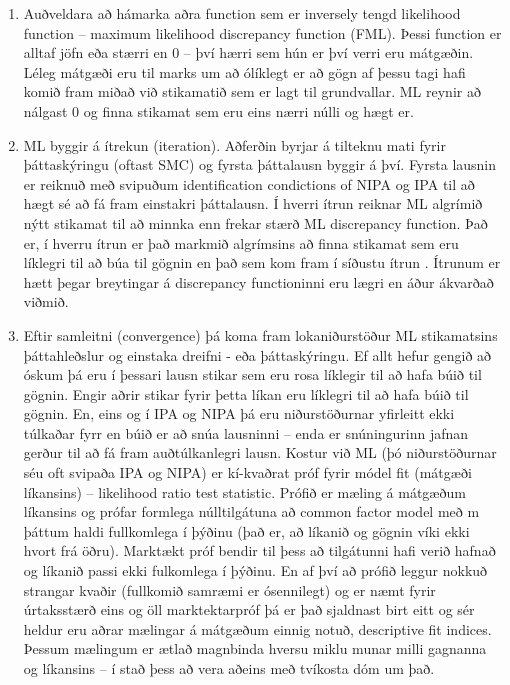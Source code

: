 \documentclass[]{book}
\providecommand{\tightlist}{%
  \setlength{\itemsep}{0pt}\setlength{\parskip}{0pt}}
\begin{document}
\begin{enumerate}
\def\labelenumi{\arabic{enumi})}
\tightlist
\item
  Auðveldara að hámarka aðra function sem er inversely tengd likelihood function -- maximum likelihood discrepancy function (FML). Þessi function er alltaf jöfn eða stærri en 0 -- því hærri sem hún er því verri eru mátgæðin. Léleg mátgæði eru til marks um að ólíklegt er að gögn af þessu tagi hafi komið fram miðað við stikamatið sem er lagt til grundvallar. ML reynir að nálgast 0 og finna stikamat sem eru eins nærri núlli og hægt er.
\item
  ML byggir á ítrekun (iteration). Aðferðin byrjar á tilteknu mati fyrir þáttaskýringu (oftast SMC) og fyrsta þáttalausn byggir á því. Fyrsta lausnin er reiknuð með svipuðum identification condictions of NIPA og IPA til að hægt sé að fá fram einstakri þáttalausn. Í hverri ítrun reiknar ML algrímið nýtt stikamat til að minnka enn frekar stærð ML discrepancy function. Það er, í hverru ítrun er það markmið algrímsins að finna stikamat sem eru líklegri til að búa til gögnin en það sem kom fram í síðustu ítrun . Ítrunum er hætt þegar breytingar á discrepancy functioninni eru lægri en áður ákvarðað viðmið.
\item
  Eftir samleitni (convergence) þá koma fram lokaniðurstöður ML stikamatsins þáttahleðslur og einstaka dreifni - eða þáttaskýringu. Ef allt hefur gengið að óskum þá eru í þessari lausn stikar sem eru rosa líklegir til að hafa búið til gögnin. Engir aðrir stikar fyrir þetta líkan eru líklegri til að hafa búið til gögnin. En, eins og í IPA og NIPA þá eru niðurstöðurnar yfirleitt ekki túlkaðar fyrr en búið er að snúa lausninni -- enda er snúningurinn jafnan gerður til að fá fram auðtúlkanlegri lausn.
  Kostur við ML (þó niðurstöðurnar séu oft svipaða IPA og NIPA) er kí-kvaðrat próf fyrir módel fit (mátgæði líkansins) -- likelihood ratio test statistic. Prófið er mæling á mátgæðum líkansins og prófar formlega núlltilgátuna að common factor model með m þáttum haldi fullkomlega í þýðinu (það er, að líkanið og gögnin víki ekki hvort frá öðru). Marktækt próf bendir til þess að tilgátunni hafi verið hafnað og líkanið passi ekki fulkomlega í þýðinu. En af því að prófið leggur nokkuð strangar kvaðir (fullkomið samræmi er ósennilegt) og er næmt fyrir úrtaksstærð eins og öll marktektarpróf þá er það sjaldnast birt eitt og sér heldur eru aðrar mælingar á mátgæðum einnig notuð, descriptive fit indices. Þessum mælingum er ætlað magnbinda hversu miklu munar milli gagnanna og líkansins -- í stað þess að vera aðeins með tvíkosta dóm um það.
\end{enumerate}
\end{document}
